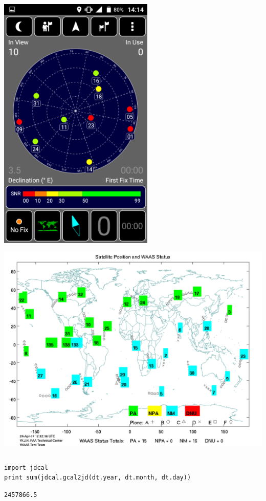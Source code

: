 \documentclass[12pt,fleqn]{article}\usepackage{../../common}
\begin{document}
\includegraphics[width=20em]{gpstest.png}

\includegraphics[width=40em]{waas_sats.png}

\inputminted[fontsize=\footnotesize]{python}{orbital.py}

\begin{verbatim}
import jdcal
print sum(jdcal.gcal2jd(dt.year, dt.month, dt.day))
\end{verbatim}

\begin{verbatim}
2457866.5
\end{verbatim}
\end{document}
